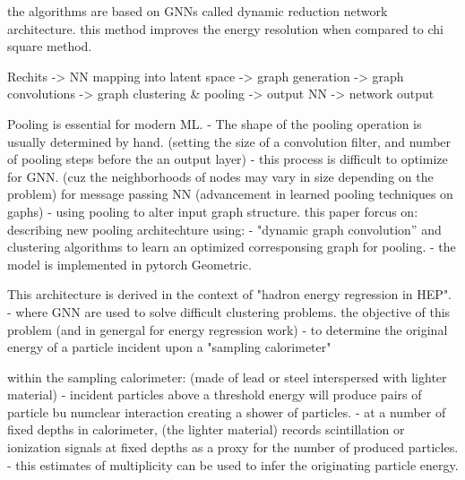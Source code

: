 the algorithms are based on GNNs called dynamic reduction network architecture. 
this method improves the energy resolution when compared to chi square method.

Rechits -> NN mapping into latent space -> graph generation -> graph convolutions -> graph clustering & pooling -> output NN -> network output


Pooling is essential for modern ML.
- The shape of the pooling operation is usually determined by hand. (setting the size of a convolution filter, and number of pooling steps before the an output layer)
- this process is difficult to optimize for GNN. (cuz the neighborhoods of nodes may vary in size depending on the problem)
for message passing NN (advancement in learned pooling techniques on gaphs)
- using pooling to alter input graph structure.
this paper forcus on: describing new pooling architechture using:
- "dynamic graph convolution'' and clustering algorithms to learn an optimized corresponsing graph for pooling.
- the model is implemented in pytorch Geometric.

This architecture is derived in the context of "hadron energy regression in HEP".
- where GNN are used to solve difficult clustering problems.
the objective of this problem (and in genergal for energy regression work)
- to determine the original energy of a particle incident upon a "sampling calorimeter"

within the sampling calorimeter: (made of lead or steel interspersed with lighter material)
- incident particles above a threshold energy will produce pairs of particle bu numclear interaction creating a shower of particles.
- at a number of fixed depths in calorimeter, (the lighter material) records scintillation or ionization signals at fixed depths as a proxy for the number of produced particles.
- this estimates of multiplicity can be used to infer the originating particle energy.

